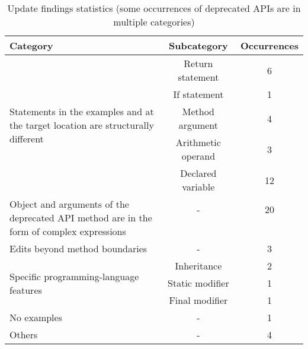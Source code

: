 \begin{table}
\caption{Update findings statistics (some occurrences of deprecated APIs
are in multiple categories)}
\begin{center}
\begin{tabular}{ | p{12em} |c|c| }
 \hline
 \textbf{Category} & \textbf{Subcategory} & \textbf{Occurrences} \\
 \hline
 \multirow{5}{12em}{Statements in the examples and at the target location are structurally different} & Return statement & 6 \\\cline{2-3} & If statement & 1 \\\cline{2-3} & Method argument & 4 \\\cline{2-3} & Arithmetic operand & 3 \\\cline{2-3}  & Declared variable & 12 \\\cline{2-3}
 \hline
  \multirow{4}{12em}{Object and arguments of the deprecated API method are in the form of complex expressions} & - & 20\\&&\\&&\\&&\\
 \hline
 Edits beyond method boundaries & - & 3\\
\hline
 \multirow{3}{12em}{Specific programming-language features} & Inheritance & 2\\\cline{2-3} & Static modifier & 1 \\\cline{2-3} & Final modifier & 1\\\cline{2-3}
 \hline
 No examples & - & 1\\
 \hline
 Others & - & 4\\
 \hline
\end{tabular}
\end{center}
\label{table:data_statistic}
\end{table}

